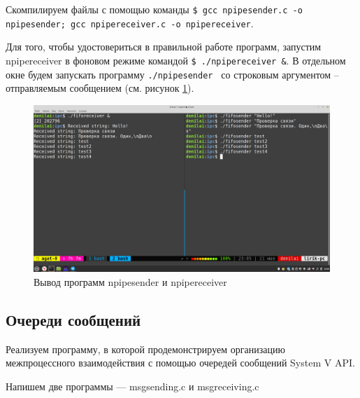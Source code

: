 \documentclass[a4paper,14pt]{extarticle}
\begin{document}
Скомпилируем файлы с помощью команды \texttt{\$ gcc npipesender.c -o npipesender; gcc npipereceiver.c -o npipereceiver}.

Для того, чтобы удостовериться в правильной работе программ, запустим npipereceiver в фоновом режиме командой \texttt{\$ ./npipereceiver \&}. В отдельном окне будем запускать программу \texttt{./npipesender } со строковым аргументом -- отправляемым сообщением (см. рисунок \ref{fig:demo}).

\begin{figure}[h!]
	\centering
	\includegraphics[width=0.9\linewidth]{images/6/demo}
	\caption{Вывод программ npipesender и npipereceiver}
	\label{fig:demo}
\end{figure}
\newpage
\subsection{Очереди сообщений}

Реализуем программу, в которой продемонстрируем организацию межпроцессного взаимодействия с помощью очередей сообщений System V API.

Напишем две программы --- msgsending.c и msgreceiving.c 
\end{document}
